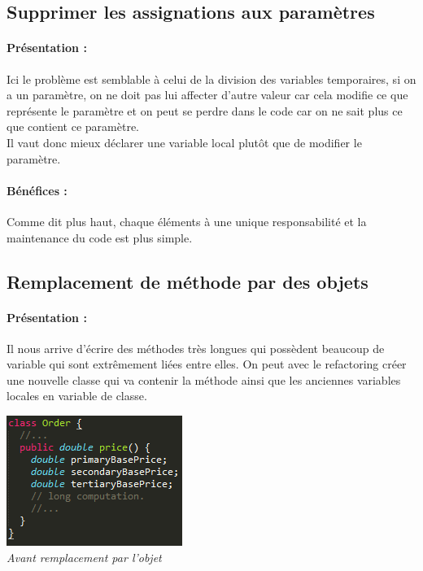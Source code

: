 \documentclass[a4paper,twoside,12pt,openright]{report}
\begin{document}
\subsection{Supprimer les assignations aux paramètres}
\paragraph{Présentation :}
Ici le problème est semblable à celui de la division des variables temporaires, si on a un paramètre, on ne doit pas lui affecter d'autre valeur car cela modifie ce que représente le paramètre et on peut se perdre dans le code car on ne sait plus ce que contient ce paramètre.\\
Il vaut donc mieux déclarer une variable local plutôt que de modifier le paramètre.

\paragraph{Bénéfices :}
Comme dit plus haut, chaque éléments à une unique responsabilité et la maintenance du code est plus simple.\\

\subsection{Remplacement de méthode par des objets}
\paragraph{Présentation :}
Il nous arrive d'écrire des méthodes très longues qui possèdent beaucoup de variable qui sont extrêmement liées entre elles. On peut avec le refactoring créer une nouvelle classe qui va contenir la méthode ainsi que les anciennes variables locales en variable de classe.

\begin{center}
\includegraphics[scale=1]{Image/MethodeToObjet.png}\\
\itshape{Avant remplacement par l'objet \cite{ref5}}
\end{center}
\end{document}

